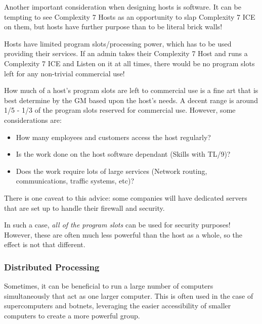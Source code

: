 \begin{multicols}{3}
	Another important consideration when designing hosts is software. It can be tempting to see Complexity 7 Hosts as an opportunity to slap Complexity 7 ICE on them, but hosts have further purpose than to be literal brick walls!
	
	Hosts have limited program slots/processing power, which has to be used providing their services. If an admin takes their Complexity 7 Host and runs a Complexity 7 ICE and Listen on it at all times, there would be no program slots left for any non-trivial commercial use!
	
	How much of a host's program slots are left to commercial use is a fine art that is best determine by the GM based upon the host's needs. A decent range is around 1/5 - 1/3 of the program slots reserved for commercial use. However, some considerations are: 
	
	\begin{itemize}
		\itemsep 0pt
		\item How many employees and customers access the host regularly? 
		\item Is the work done on the host software dependant (Skills with TL/9)?
		\item Does the work require lots of large services (Network routing, communications, traffic systems, etc)?
	\end{itemize}
	
	There is one caveat to this advice: some companies will have dedicated servers that are set up to handle their firewall and security. 
	
	In such a case, \textit{all of the program slots} can be used for security purposes! However, these are often much less powerful than the host as a whole, so the effect is not that different.
	
	\begin{wrapfigure}[17]{l}{70pt}
		
	\end{wrapfigure}
	
	\subsubsection{Distributed Processing}
	
	Sometimes, it can be beneficial to run a large number of computers simultaneously that act as one larger computer. This is often used in the case of supercomputers and botnets, leveraging the easier accessibility of smaller computers to create a more powerful group.
	

\end{multicols}
